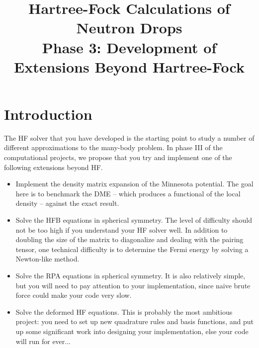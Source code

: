 \documentclass[letterpaper,12pt]{article}
\begin{document}
\title{Hartree-Fock Calculations of Neutron Drops\\
\Large{Phase 3: Development of Extensions Beyond Hartree-Fock}}
\maketitle



\section{Introduction}

The HF solver that you have developed is the starting point to study a number 
of different approximations to the many-body problem. In phase III of the 
computational projects, we propose that you try and implement one of the 
following extensions beyond HF.
\begin{itemize}
\item Implement the density matrix expansion of the Minnesota potential. The 
goal here is to benchmark the DME -- which produces a functional of the local 
density -- against the exact result.
\item Solve the HFB equations in spherical symmetry. The level of difficulty 
should not be too high if you understand your HF solver well. In addition to 
doubling the size of the matrix to diagonalize and dealing with the pairing 
tensor, one technical difficulty is to determine the Fermi energy by solving a 
Newton-like method.
\item Solve the RPA equations in spherical symmetry. It is also relatively 
simple, but you will need to pay attention to your implementation, since naive 
brute force could make your code very slow.
\item Solve the deformed HF equations. This is probably the most ambitious
project: you need to set up new quadrature rules and basis functions, and put 
up some significant work into designing your implementation, else your code 
will run for ever...
\end{itemize}

\end{document}
